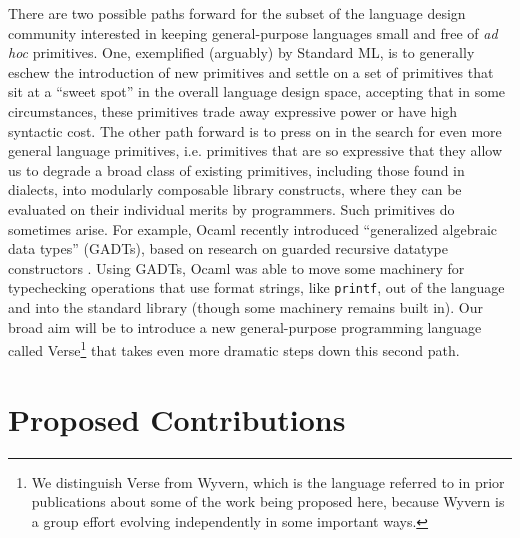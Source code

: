 \newpage There are two possible paths forward for the subset of the language design community interested in keeping general-purpose languages small and free of \emph{ad hoc} primitives. One, exemplified (arguably) by Standard ML, is to generally eschew the introduction of new primitives and settle on a set of primitives that sit at a ``sweet spot'' in the overall language design space, accepting that in some circumstances, these primitives trade away expressive power or have high syntactic cost. %
The other path forward is to press on in the search for even more general language primitives, i.e. primitives that are so expressive that they allow us to degrade a broad class of existing primitives, including those found in dialects, into modularly composable library constructs, where they can be evaluated on their individual merits by programmers. %
Such primitives do sometimes arise. For example, Ocaml recently introduced  ``generalized algebraic data types'' (GADTs), based on research on guarded recursive datatype constructors \cite{XiCheChe03}. Using GADTs, Ocaml was able to move some machinery for typechecking operations that use format strings, like \texttt{printf}, out of the language and into the standard library (though some machinery remains built in). Our broad aim will be to introduce a new general-purpose programming language called Verse\footnote{We distinguish Verse from Wyvern, which is the language referred to in prior publications about some of the work being proposed here, because Wyvern is a group effort evolving independently in some important ways.} that takes even more dramatic steps down this second path. %


\section{Proposed Contributions}



